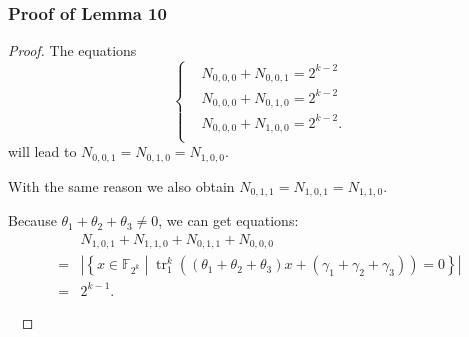 \documentclass[
    aspectratio=169,                   %
]{beamer}
\newcommand{\F}{\mathbb{F}}
\newcommand{\tr}{\operatorname{tr}_1^k}
\begin{document}
        
        \begin{frame}
            \frametitle{Proof of Lemma 10}
          
            \begin{proof}
              The equations 
                \begin{equation}\label{eq:from_lemma_1}\left\{\begin{alignedat}{3}
                  &N_{0,0,0}+N_{0,0,1}=2^{k-2}\\
                  &N_{0,0,0}+N_{0,1,0}=2^{k-2}\\
                  &N_{0,0,0}+N_{1,0,0}=2^{k-2}.\\
                \end{alignedat}\right.\end{equation}
                will lead to $ N_{0,0,1}=N_{0,1,0}=N_{1,0,0} $. 
                
                With the same reason we also obtain  $ N_{0,1,1}=N_{1,0,1}=N_{1,1,0} $. 
    
                Because $ \theta_1+\theta_2+\theta_3\ne 0 $, we can get equations: 
                \begin{align}\label{eq:sum_three_trace} 
                    &N_{1,0,1}+N_{1,1,0}+N_{0,1,1}+N_{0,0,0}\nonumber\\
                    =&\left\lvert\left\{x\in\F_{2^k}\middle|\tr\left(\left(\theta_1+\theta_2+\theta_3\right)x+\left(\gamma_1+\gamma_2+\gamma_3\right)\right)=0\right\}\right\rvert\\
                    =&2^{k-1}.\nonumber
                \end{align}

                \par~\par
            \end{proof}
        \end{frame}   
\end{document}
